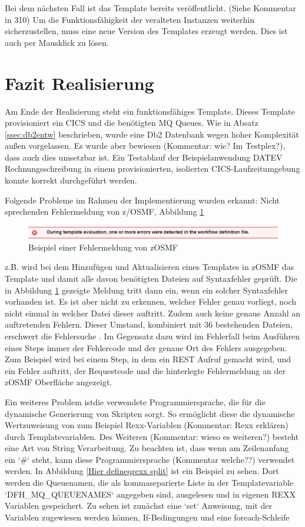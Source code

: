 Bei dem nächsten Fall ist das Template bereits veröffentlicht. (Siehe Kommentar in 310)
Um die Funktionsfähigkeit der veralteten Instanzen weiterhin sicherzustellen, muss eine neue Version des Templates erzeugt werden.
Dies ist auch per Mausklick zu lösen.

\section{Fazit Realisierung}
Am Ende der Realisierung steht ein funktionsfähiges Template.
Dieses Template provisioniert ein CICS und die benötigten MQ Queues.
Wie in Absatz \ref{ssec:db2entw} beschrieben, wurde eine Db2 Datenbank wegen hoher Komplexität außen vorgelassen.
Es wurde aber bewiesen (Kommentar: wie? Im Testplex?), dass auch dies umsetzbar ist.
Ein Testablauf der Beispielanwendung DATEV Rechnungsschreibung in einem provisionierten, isolierten CICS-Laufzeitumgebung konnte korrekt durchgeführt werden.

Folgende Probleme im Rahmen der Implementierung wurden erkannt:
Nicht sprechenden Fehlermeldung von z/OSMF, Abbildung \ref{fig:zosmffehler} 
\begin{figure}[h]
	\centering
	\includegraphics[width=\textwidth]{figures/zosmffehlermeldung.png}
	\caption{Beispiel einer Fehlermeldung von zOSMF}
	\label{fig:zosmffehler}
\end{figure}
z.B. wird bei dem Hinzufügen und Aktualisieren eines Templates in zOSMF das Template und damit alle davon benötigten Dateien auf Syntaxfehler geprüft.
Die in Abbildung \ref{fig:zosmffehler} gezeigte Meldung tritt dann ein, wenn ein solcher Syntaxfehler vorhanden ist.
Es ist aber nicht zu erkennen, welcher Fehler genau vorliegt, noch nicht einmal in welcher Datei dieser auftritt.
Zudem auch keine genaue Anzahl an auftretenden Fehlern.
Dieser Umstand, kombiniert mit 36 bestehenden Dateien, erschwert die Fehlersuche .
Im Gegensatz dazu wird im Fehlerfall beim Ausführen eines Steps immer der Fehlercode und der genaue Ort des Fehlers ausgegeben.
Zum Beispiel wird bei einem Step, in dem ein REST Aufruf gemacht wird, und ein Fehler auftritt, der Requestcode und die hinterlegte Fehlermeldung an der zOSMF Oberfläche angezeigt. 

Ein weiteres Problem istdie verwendete Programmiersprache, die für die dynamische Generierung von Skripten sorgt.
So ermöglicht diese die dynamische Wertzuweisung von zum Beispiel Rexx-Variablen (Kommentar: Rexx erklären) durch Templatevariablen.
Des Weiteren (Kommentar: wieso es weiteren?) besteht eine Art von String Verarbeitung.
Zu beachten ist, dass wenn am Zeilenanfang ein `\#` steht, kann diese Programmiersprache (Kommentar welche??)  verwendet werden.
In Abbildung \ref{Hier defineqrexx split} ist ein Beispiel zu sehen.
Dort werden die Queuenamen, die als kommaseparierte Liste in der Templatevariable `DFH\_MQ\_QUEUENAMES` angegeben sind, ausgelesen und in eigenen REXX Variablen gespeichert.
Zu sehen ist zunächst eine `set` Anweisung, mit der Variablen zugewiesen werden können, If-Bedingungen und eine foreach-Schleife 

